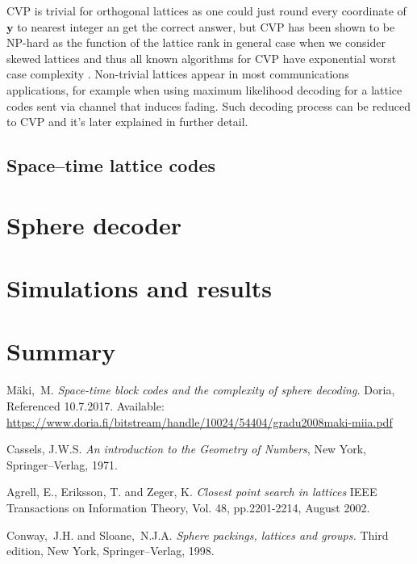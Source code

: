 \documentclass[english,12pt,a4paper,pdftex,sci,utf8]{aaltothesis}
\begin{document}
CVP is trivial for orthogonal lattices as one could just round every coordinate of $\mathbf{y}$ to nearest integer an get the correct answer, but CVP has been shown to be NP-hard as the function of the lattice rank in general case when we consider skewed lattices and thus all known algorithms for CVP have exponential worst case complexity \cite{agrell}. Non-trivial lattices appear in most communications applications, for example when using maximum likelihood decoding for a lattice codes sent via channel that induces fading. Such decoding process can be reduced to CVP and it's later explained in further detail.

\subsection{Space--time lattice codes}



\clearpage

\section{Sphere decoder}

\clearpage

\section{Simulations and results}
 
\clearpage

\section{Summary}


\clearpage

{}
\begin{thebibliography}{99}

 Mäki,\ M. \textit{Space-time block codes and the complexity of sphere decoding.} Doria, Referenced 10.7.2017. Available:
  \url{https://www.doria.fi/bitstream/handle/10024/54404/gradu2008maki-miia.pdf}
  
  
 Cassels, J.W.S. \textit{An introduction to the Geometry of Numbers}, New York, Springer--Verlag, 1971.

 Agrell, E., Eriksson, T. and Zeger, K. \textit{Closest point search in lattices} IEEE Transactions on Information Theory, Vol. 48, pp.2201-2214,
August 2002.

 Conway,\ J.H. and Sloane,\ N.J.A. \textit{Sphere packings, lattices and groups.} Third edition, New York, Springer--Verlag, 1998.


\end{thebibliography}
\end{document}
